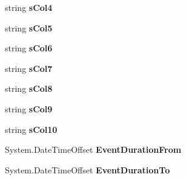 \begin{DoxyCompactItemize}
\item 
string {\bfseries s\+Col4}\hypertarget{a00083_aaf831cc4c7d39d33088259d73100c28e}{}\label{a00083_aaf831cc4c7d39d33088259d73100c28e}

\item 
string {\bfseries s\+Col5}\hypertarget{a00083_a9d788f00ff24e021753e869903d98efc}{}\label{a00083_a9d788f00ff24e021753e869903d98efc}

\item 
string {\bfseries s\+Col6}\hypertarget{a00083_af3d53c54406c375745a492f1a62b7f97}{}\label{a00083_af3d53c54406c375745a492f1a62b7f97}

\item 
string {\bfseries s\+Col7}\hypertarget{a00083_af79d3347ba9c913d71abac59abcfaf25}{}\label{a00083_af79d3347ba9c913d71abac59abcfaf25}

\item 
string {\bfseries s\+Col8}\hypertarget{a00083_afe11d05e02ae05d9fa1d5743f80a2056}{}\label{a00083_afe11d05e02ae05d9fa1d5743f80a2056}

\item 
string {\bfseries s\+Col9}\hypertarget{a00083_a78855e10b89da802a2a35c9da3c6c99f}{}\label{a00083_a78855e10b89da802a2a35c9da3c6c99f}

\item 
string {\bfseries s\+Col10}\hypertarget{a00083_a76245d14731ba4f364e607976e5110ea}{}\label{a00083_a76245d14731ba4f364e607976e5110ea}

\item 
System.\+Date\+Time\+Offset {\bfseries Event\+Duration\+From}\hypertarget{a00083_a107efcc4f969c5be6bb226841afd2458}{}\label{a00083_a107efcc4f969c5be6bb226841afd2458}

\item 
System.\+Date\+Time\+Offset {\bfseries Event\+Duration\+To}\hypertarget{a00083_affacfb31a5173982c870e1f23571f941}{}\label{a00083_affacfb31a5173982c870e1f23571f941}


\end{DoxyCompactItemize}
